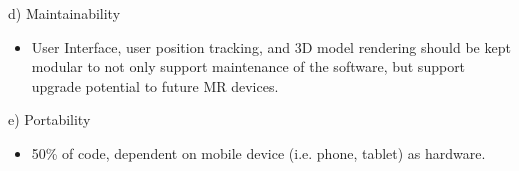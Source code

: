 \documentclass[onecolumn, draftclsnofoot,10pt, compsoc]{IEEEtran}
\begin{document}
        \noindent d) Maintainability%
        \begin{itemize}
            \item User Interface, user position tracking, and 3D model rendering should be kept modular to not only support maintenance of the software, but support upgrade potential to future MR devices.
        \end{itemize}
        e) Portability%
        \begin{itemize}
            \item 50\% of code, dependent on mobile device (i.e. phone, tablet) as hardware.
        \end{itemize}
\end{document}
